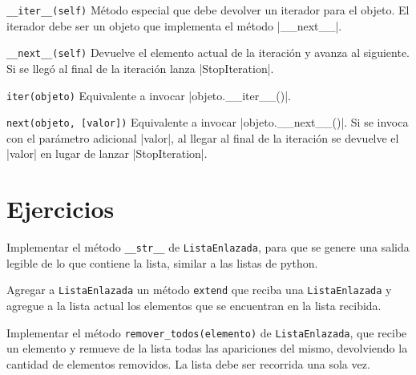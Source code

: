 \begin{referencia_python}

\begin{sintaxis}{\lstinline{__iter__(self)}}
Método especial que debe devolver un iterador para el objeto. El iterador debe
ser un objeto que implementa el método |__next__|.
\end{sintaxis}

\begin{sintaxis}{\lstinline{__next__(self)}}
Devuelve el elemento actual de la iteración y avanza al siguiente.
Si se llegó al final de la iteración lanza |StopIteration|.
\end{sintaxis}

\begin{sintaxis}{\lstinline{iter(objeto)}}
Equivalente a invocar |objeto.__iter__()|.
\end{sintaxis}

\begin{sintaxis}{\lstinline{next(objeto, [valor])}}
Equivalente a invocar |objeto.__next__()|. Si se invoca con el parámetro
adicional |valor|, al llegar al final de la iteración se devuelve el |valor| en
lugar de lanzar |StopIteration|.
\end{sintaxis}
\end{referencia_python}

\newpage
\section{Ejercicios}

\begin{ejercicio}
Implementar el método \verb!__str__! de \verb|ListaEnlazada|, para que se
genere una salida legible de lo que contiene la lista, similar a las listas de
python.
\end{ejercicio}

\begin{ejercicio}
Agregar a \verb|ListaEnlazada| un método \verb!extend! que reciba una
\verb|ListaEnlazada| y agregue a la lista actual los elementos que se encuentran
en la lista recibida.
\end{ejercicio}

\begin{ejercicio}
Implementar el método \verb|remover_todos(elemento)| de \verb|ListaEnlazada|, que recibe
un elemento y remueve de la lista todas las apariciones del mismo, devolviendo la cantidad
de elementos removidos. La lista debe ser recorrida una sola vez.
\end{ejercicio}

